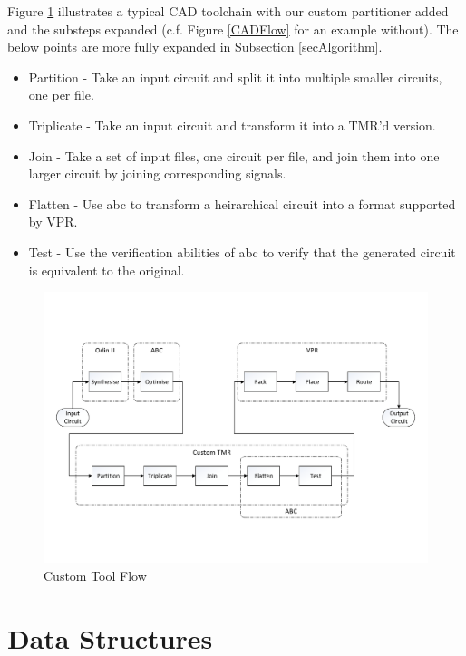 \documentclass[12pt,final,oneside]{dwThesis} %
\begin{document}
   Figure \ref{algToolflow} illustrates a typical \ac{CAD} toolchain with our custom partitioner added and the substeps expanded (c.f. Figure \ref{CADFlow} for an example without). The below points are more fully expanded in Subsection \ref{secAlgorithm}.
   \begin{itemize}
      \item Partition - Take an input circuit and split it into multiple smaller circuits, one per file.
      \item Triplicate - Take an input circuit and transform it into a TMR'd version.
      \item Join - Take a set of input files, one circuit per file, and join them into one larger circuit by joining corresponding signals.
      \item Flatten - Use abc to transform a heirarchical circuit into a format supported by VPR.
      \item Test - Use the verification abilities of abc to verify that the generated circuit is equivalent to the original.
   \end{itemize}
   
   \begin{figure}
      \begin{center}
         \includegraphics[width=\linewidth]{images/CadFlowWPartitioner.pdf}
         \caption{Custom Tool Flow}
         \label{algToolflow}
      \end{center}
   \end{figure}
   

   \section{Data Structures}\label{secDatastructures}
\end{document}

